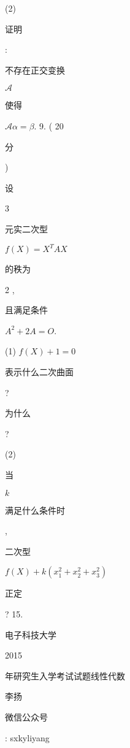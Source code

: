 \documentclass[10pt]{article}
\begin{document}
(2) \begin{CJK}{UTF8}{mj}证明\end{CJK}: \begin{CJK}{UTF8}{mj}不存在正交变换\end{CJK} $\mathcal{A}$ \begin{CJK}{UTF8}{mj}使得\end{CJK} $\mathcal{A} \alpha=\beta$. 9. ( 20 \begin{CJK}{UTF8}{mj}分\end{CJK}) \begin{CJK}{UTF8}{mj}设\end{CJK} 3 \begin{CJK}{UTF8}{mj}元实二次型\end{CJK} $f(X)=X^{T} A X$ \begin{CJK}{UTF8}{mj}的秩为\end{CJK} 2 , \begin{CJK}{UTF8}{mj}且满足条件\end{CJK} $A^{2}+2 A=O$.

(1) $f(X)+1=0$ \begin{CJK}{UTF8}{mj}表示什么二次曲面\end{CJK}? \begin{CJK}{UTF8}{mj}为什么\end{CJK}?

(2) \begin{CJK}{UTF8}{mj}当\end{CJK} $k$ \begin{CJK}{UTF8}{mj}满足什么条件时\end{CJK}, \begin{CJK}{UTF8}{mj}二次型\end{CJK} $f(X)+k\left(x_{1}^{2}+x_{2}^{2}+x_{3}^{2}\right)$ \begin{CJK}{UTF8}{mj}正定\end{CJK}? 15. \begin{CJK}{UTF8}{mj}电子科技大学\end{CJK} 2015 \begin{CJK}{UTF8}{mj}年研究生入学考试试题线性代数\end{CJK}

\begin{CJK}{UTF8}{mj}李扬\end{CJK}

\begin{CJK}{UTF8}{mj}微信公众号\end{CJK}: sxkyliyang
\end{document}
